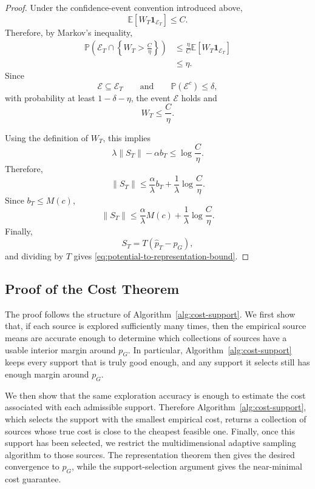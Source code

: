 \documentclass[twoside]{article}
\begin{document}
\begin{proof}
Under the confidence-event convention introduced above,
\[
    \mathbb E\left[
        W_T\mathbf 1_{\mathcal E_T}
    \right]
    \le C.
\]
Therefore, by Markov's inequality,
\[
\begin{aligned}
    \mathbb P\left(
        \mathcal E_T
        \cap
        \left\{
            W_T>\frac{C}{\eta}
        \right\}
    \right)
    &\le
    \frac{\eta}{C}
    \mathbb E\left[
        W_T\mathbf 1_{\mathcal E_T}
    \right]
    \\
    &\le
    \eta.
\end{aligned}
\]
Since
\[
    \mathcal E\subseteq\mathcal E_T
    \qquad\text{and}\qquad
    \mathbb P(\mathcal E^c)\le\delta,
\]
with probability at least \(1-\delta-\eta\), the event \(\mathcal E\) holds
and
\[
    W_T
    \le
    \frac{C}{\eta}.
\]

Using the definition of \(W_T\), this implies
\[
    \lambda\|S_T\|-\alpha b_T
    \le
    \log\frac{C}{\eta}.
\]
Therefore,
\[
    \|S_T\|
    \le
    \frac{\alpha}{\lambda}b_T
    +
    \frac{1}{\lambda}
    \log\frac{C}{\eta}.
\]
Since \(b_T\le M(c)\),
\[
    \|S_T\|
    \le
    \frac{\alpha}{\lambda}M(c)
    +
    \frac{1}{\lambda}
    \log\frac{C}{\eta}.
\]
Finally,
\[
    S_T
    =
    T(\widehat p_T-p_G),
\]
and dividing by \(T\) gives
\eqref{eq:potential-to-representation-bound}.
\end{proof}
\subsection{Proof of the Cost Theorem}
The proof follows the structure of Algorithm~\ref{alg:cost-support}. We first
show that, if each source is explored sufficiently many times, then the empirical
source means are accurate enough to determine which collections of sources have a
usable interior margin around \(p_G\). In particular,
Algorithm~\ref{alg:cost-support} keeps every support that is truly good enough,
and any support it selects still has enough margin around \(p_G\).

We then show that the same exploration accuracy is enough to estimate the cost
associated with each admissible support. Therefore
Algorithm~\ref{alg:cost-support}, which selects the support with the smallest
empirical cost, returns a collection of sources whose true cost is close to the
cheapest feasible one. Finally, once this support has been selected, we
restrict the multidimensional adaptive sampling algorithm to those sources. The
representation theorem then gives the desired convergence to \(p_G\), while
the support-selection argument gives the near-minimal cost guarantee.
\end{document}
